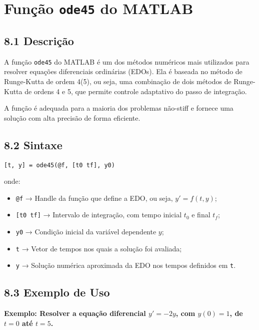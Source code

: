 \chapter{Função \texttt{ode45} do MATLAB}

\section*{8.1 Descrição}

A função \texttt{ode45} do MATLAB é um dos métodos numéricos mais utilizados para resolver equações diferenciais ordinárias (EDOs). Ela é baseada no método de Runge-Kutta de ordem 4(5), ou seja, uma combinação de dois métodos de Runge-Kutta de ordens 4 e 5, que permite controle adaptativo do passo de integração.

A função é adequada para a maioria dos problemas não-stiff e fornece uma solução com alta precisão de forma eficiente.

\section*{8.2 Sintaxe}

\begin{verbatim}
[t, y] = ode45(@f, [t0 tf], y0)
\end{verbatim}

onde:
\begin{itemize}
    \item \texttt{@f} → Handle da função que define a EDO, ou seja, $y' = f(t, y)$;
    \item \texttt{[t0 tf]} → Intervalo de integração, com tempo inicial $t_0$ e final $t_f$;
    \item \texttt{y0} → Condição inicial da variável dependente $y$;
    \item \texttt{t} → Vetor de tempos nos quais a solução foi avaliada;
    \item \texttt{y} → Solução numérica aproximada da EDO nos tempos definidos em \texttt{t}.
\end{itemize}

\section*{8.3 Exemplo de Uso}

\textbf{Exemplo: Resolver a equação diferencial $y' = -2y$, com $y(0) = 1$, de $t = 0$ até $t = 5$.}

